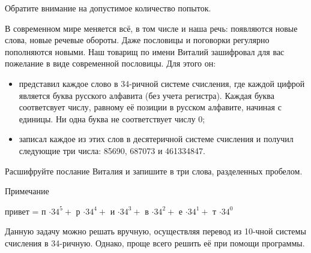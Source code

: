 
Обратите внимание на допустимое количество попыток.

В современном мире меняется всё, в том числе и наша речь: появляются новые слова, новые речевые обороты. Даже пословицы и поговорки регулярно пополняются новыми. Наш товарищ по имени Виталий зашифровал для вас пожелание в виде современной пословицы. Для этого он:
\begin{itemize}
\item представил каждое слово в 34-ричной системе счисления, где каждой цифрой является буква русского алфавита (без учета регистра). Каждая буква соответсвует числу, равному её позиции в русском алфавите, начиная с единицы. Ни одна буква не соответствует числу 0; 
\item записал каждое из этих слов в десятеричной системе счисления и получил следующие три числа: 85690, 687073 и 461334847. 
\end{itemize}

Расшифруйте послание Виталия и 
запишите в три слова, разделенных пробелом.

Примечание

привет = п $\cdot 34^5 +$ р $\cdot 34^4 +$ и $\cdot 34^3 +$ в $\cdot 34^2 +$ е $\cdot 34^1 +$ т $\cdot 34^0$ 

\soultionSection
Данную задачу можно решать вручную, осуществляя перевод из 10-чной системы счисления в 34-ричную. Однако, проще всего решить её при помощи программы.


